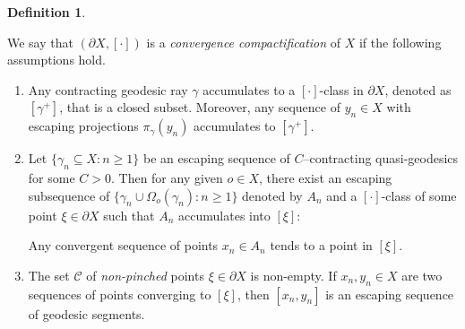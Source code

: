 \documentclass{amsart}
\theoremstyle{definition}
\newtheorem{defn}[thm]{Definition}
\theoremstyle{remark}
\newcommand{\U}{ X}
\newcommand{\pU}{\partial{  X}}
\begin{document}
\begin{defn}\label{ConvBdryDefn}
    
We say that $(\pU,[\cdot])$ is a \textit{convergence compactification} of $X$ if the following assumptions hold.
\begin{enumerate}
    \item[\textbf{(A)}]Any contracting geodesic ray $\gamma$ accumulates to a $[\cdot]$-class in $\pU$, denoted as $[\gamma^+]$, that is a closed subset. Moreover, any sequence of    $y_n\in \U$ with escaping projections $\pi_\gamma(y_n)$ accumulates to $[\gamma^+]$. 

    \item[\textbf{(B)}]
    Let $\{\gamma_n\subseteq \U :n\ge 1\}$ be an escaping sequence of $C$--contracting  quasi-geodesics for some $C>0$. Then for any given $o\in \U$, there exist an escaping subsequence of $\{\gamma_n\cup \Omega_o(\gamma_n): n\ge 1\}$ denoted by $A_n$  and a $[\cdot]$-class of some point $\xi\in \pU$ such that $A_n$  accumulates    into $[\xi]$:
    
    Any convergent sequence of points $x_n\in A_n$ tends to a point in $[\xi]$.
    \item[\textbf{(C)}]
    The set   $\mathcal C$ of \textit{non-pinched} points  $\xi\in \pU$ is non-empty. If $x_n, y_n\in \U$ are two sequences of points converging to $[\xi]$, then $[x_n,y_n]$ is an escaping sequence of geodesic segments.  
\end{enumerate}  
\end{defn}  
\end{document}

